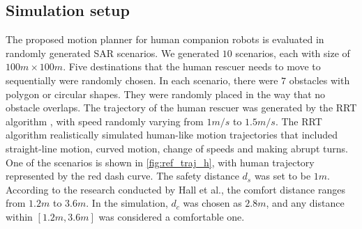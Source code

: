 \documentclass[journal]{IEEEtran}
\newcommand{\todonote}[1]{\vspace{0px} %
	\todo[inline, color=green!30]{\textbf{[Note:]} {#1}} %
}
\DeclareRobustCommand{\clnote}[1]{\ifthenelse{\boolean{include-notes}}%
{\textcolor{orange}{\textbf{CL: #1}}}{}}
\DeclareRobustCommand{\dhnote}[1]{\ifthenelse{\boolean{include-notes}}%
{\textcolor{blue}{\textbf{DH: #1}}}{}}
\begin{document}
    
	\subsection{Simulation setup}
	The proposed motion planner for human companion robots is evaluated in randomly generated SAR scenarios.
    We generated $10$ scenarios, each with size of $100 m\times 100 m$.
    Five destinations that the human rescuer needs to move to sequentially were randomly chosen.
	In each scenario, there were $7$ obstacles with polygon or circular shapes. They were randomly placed in the way that no obstacle overlaps.
      The trajectory of the human rescuer was generated by the RRT algorithm \cite{kuffner2000rrt}, with speed randomly varying from $1m/s$ to $1.5m/s$.
      The RRT algorithm realistically simulated human-like motion trajectories that included straight-line motion, curved motion, change of speeds and making abrupt turns.
    One of the scenarios is shown in \cref{fig:ref_traj_h}, with human trajectory represented by the red dash curve.
	The safety distance $d_s$ was set to be $1m$.
	According to the research conducted by Hall et al.\cite{hall1968proxemics}, the comfort distance ranges from $1.2m$ to $3.6m$.
	In the simulation, $d_c$ was chosen as $2.8m$, and any distance within $[1.2m,3.6m]$ was considered a comfortable one.
\end{document}
